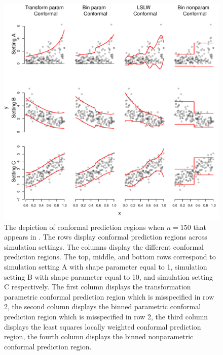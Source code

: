 \documentclass[11pt]{article}\usepackage[]{graphicx}\usepackage[]{color}
\makeatletter
\def\maxwidth{ %
  \ifdim\Gin@nat@width>\linewidth
    \linewidth
  \else
    \Gin@nat@width
  \fi
}
\newenvironment{knitrout}{}{} %
\makeatother
\begin{document}
\newpage
\begin{figure}[h!]
\begin{center}
\begin{knitrout}
\color{fgcolor}
\includegraphics[width=\maxwidth]{figure/conformal-plots-1} 

\end{knitrout}
\end{center}
\caption{The depiction of conformal prediction regions when $n = 150$ that 
  appears in \citet{eck2019conformal}.  The rows display conformal prediction 
  regions across simulation settings.  The columns display the different 
  conformal prediction regions.  The top, middle, and bottom rows correspond 
  to simulation setting A with shape parameter equal to 1, simulation setting 
  B with shape parameter equal to 10, and simulation setting C respectively.  
  The first column displays the transformation parametric conformal prediction 
  region which is misspecified in row 2, the second column displays the binned 
  parametric conformal prediction region which is misspecified in row 2,
  the third column displays the least squares locally weighted conformal 
  prediction region, the fourth column displays the binned 
  nonparametric conformal prediction region.}
\label{conformal-plots}
\end{figure}
\end{document}
